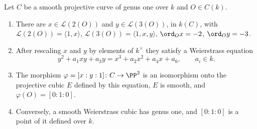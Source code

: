 \begin{theorem}\label{thm:curves:genus-one-weierstrass}
Let $C$ be a smooth projective curve of genus one over $k$ and $O\in C(k)$.
\begin{enumerate}[label=(\roman*)]
\item There are $x\in\mathcal L(2(O))$ and $y\in\mathcal L(3(O))$, in $k(C)$, with $\mathcal L(2(O))=\langle1,x\rangle$, $\mathcal L(3(O))=\langle1,x,y\rangle$, $\ord_Ox=-2$, $\ord_Oy=-3$.
\item After rescaling $x$ and $y$ by elements of $k^\times$ they satisfy a Weierstrass equation
\[
y^2+a_1xy+a_3y=x^3+a_2x^2+a_4x+a_6,\qquad a_i\in k.
\]
\item The morphism $\varphi=[x:y:1]\colon C\to\PP^2$ is an isomorphism onto the projective cubic $E$ defined by this equation, $E$ is smooth, and $\varphi(O)=[0:1:0]$.
\item Conversely, a smooth Weierstrass cubic has genus one, and $[0:1:0]$ is a point of it defined over $k$.
\end{enumerate}
\end{theorem}

